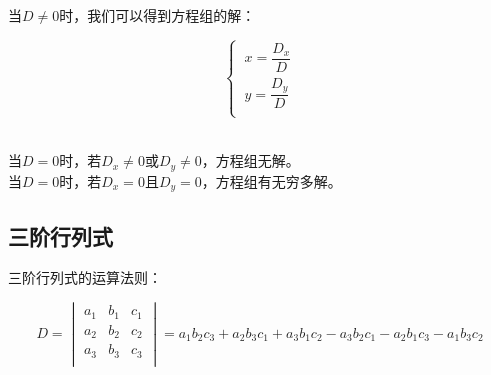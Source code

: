 \documentclass[UTF8]{ctexart}
\begin{document}
\newpage

    当$D\neq 0$时，我们可以得到方程组的解：
    \begin{large}
        \begin{equation*}
            \begin{cases}
                \ x=\dfrac{D_x}{D} \\[6mm]
                \ y=\dfrac{D_y}{D} \\
            \end{cases}
        \end{equation*}
    \end{large}\\
    当$D=0$时，若$D_x\neq 0$或$D_y\neq 0$，方程组无解。\\[3mm]
    当$D=0$时，若$D_x=0$且$D_y=0$，方程组有无穷多解。\\

\subsection{三阶行列式}
    三阶行列式的运算法则：\vspace{5pt}
    \begin{large}
        \begin{equation*}
            D=
            \begin{vmatrix}
                a_1&b_1&c_1\\
                a_2&b_2&c_2\\
                a_3&b_3&c_3\\
            \end{vmatrix}
            =a_1b_2c_3+a_2b_3c_1+a_3b_1c_2
            -a_3b_2c_1-a_2b_1c_3-a_1b_3c_2
        \end{equation*}
    \end{large}
\end{document}

